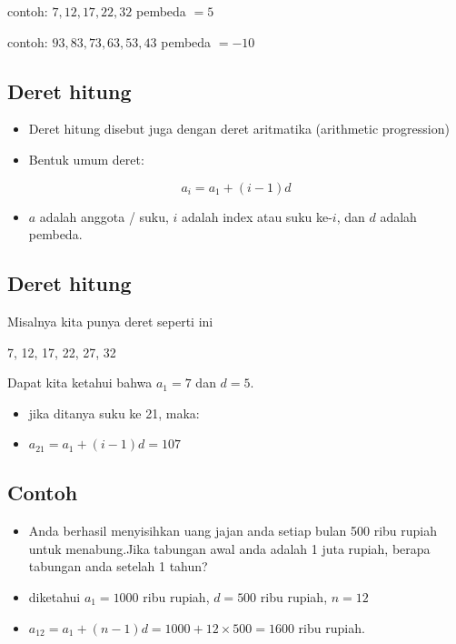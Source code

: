 \documentclass[
  letterpaper,
  DIV=11,
  numbers=noendperiod]{scrartcl}
\providecommand{\tightlist}{%
  \setlength{\itemsep}{0pt}\setlength{\parskip}{0pt}}\usepackage{longtable,booktabs,array}
\begin{document}
contoh: \(7,12,17,22,32\) pembeda \(=5\)

contoh: \(93, 83, 73,63,53,43\) pembeda \(=-10\)

\subsection{Deret hitung}\label{deret-hitung-1}

\begin{itemize}
\item
  Deret hitung disebut juga dengan deret aritmatika (arithmetic
  progression)
\item
  Bentuk umum deret:
\end{itemize}

\[
a_i=a_1+(i-1)d
\]

\begin{itemize}
\tightlist
\item
  \(a\) adalah anggota / suku, \(i\) adalah index atau suku ke-\(i\),
  dan \(d\) adalah pembeda.
\end{itemize}

\subsection{Deret hitung}\label{deret-hitung-2}

Misalnya kita punya deret seperti ini

7, 12, 17, 22, 27, 32

Dapat kita ketahui bahwa \(a_1=7\) dan \(d=5\).

\begin{itemize}
\item
  jika ditanya suku ke 21, maka:
\item
  \(a_21=a_1+(i-1)d=107\)
\end{itemize}

\subsection{Contoh}\label{contoh-3}

\begin{itemize}
\item
  Anda berhasil menyisihkan uang jajan anda setiap bulan 500 ribu rupiah
  untuk menabung.Jika tabungan awal anda adalah 1 juta rupiah, berapa
  tabungan anda setelah 1 tahun?
\item
  diketahui \(a_1=1000\) ribu rupiah, \(d=500\) ribu rupiah, \(n=12\)
\item
  \(a_12=a_1+(n-1)d=1000+12\times 500=1600\) ribu rupiah.
\end{itemize}
\end{document}

